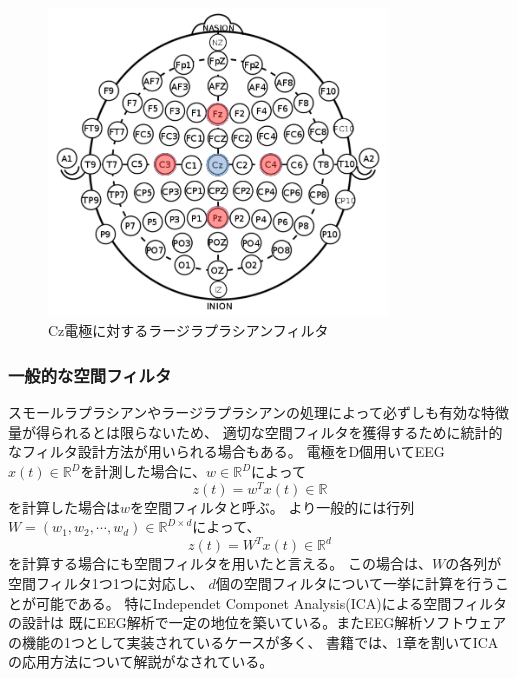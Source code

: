 \begin{figure}[p]
    \centering
    \includegraphics[width=9cm]{images/largelap.png}
    \caption{Cz電極に対するラージラプラシアンフィルタ}
    \label{fig:largelap}
\end{figure}
\subsubsection{一般的な空間フィルタ}
スモールラプラシアンやラージラプラシアンの処理によって必ずしも有効な特徴量が得られるとは限らないため、
適切な空間フィルタを獲得するために統計的なフィルタ設計方法が用いられる場合もある。
電極をD個用いてEEG\(x(t) \in \mathbb R^D\)を計測した場合に、\(w \in \mathbb R^D\)によって
\begin{equation}
    z(t) = w^T x(t) \in \mathbb R
\end{equation}
を計算した場合は\(w\)を空間フィルタと呼ぶ。
より一般的には行列\(W = (w_1, w_2, \cdots, w_d) \in \mathbb R^{D \times d}\)によって、
\begin{equation}
    z(t) = W^T x(t) \in \mathbb R^d
\end{equation}
を計算する場合にも空間フィルタを用いたと言える。
この場合は、\(W\)の各列が空間フィルタ1つ1つに対応し、
\(d\)個の空間フィルタについて一挙に計算を行うことが可能である。
特にIndependet Componet Analysis(ICA)による空間フィルタの設計は
既にEEG解析で一定の地位を築いている。またEEG解析ソフトウェアの機能の1つとして実装されているケースが多く、
書籍\cite{脳波解析入門}では、1章を割いてICAの応用方法について解説がなされている。


